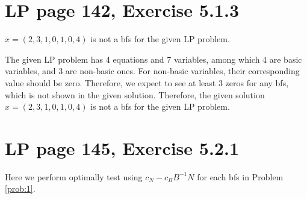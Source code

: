 \documentclass[11pt]{article}
\begin{document}
\section{LP page 142, Exercise 5.1.3}
$x=(2,3,1,0,1,0, 4)$ is not a bfs for the given LP problem. 

The given LP problem has 4 equations and 7 variables, among which 4 are basic variables, and 3 are non-basic ones. For non-basic variables, their corresponding value should be zero. Therefore, we expect to see at least 3 zeros for any bfs, which is not shown in the given solution. Therefore, the given solution $x=(2,3,1,0,1,0, 4)$ is not a bfs for the given LP problem. 

\section{LP page 145, Exercise 5.2.1}
Here we perform optimally test using $c_N - c_B B^{-1}N$ for each bfs in Problem \ref{prob:1}.
\end{document}
